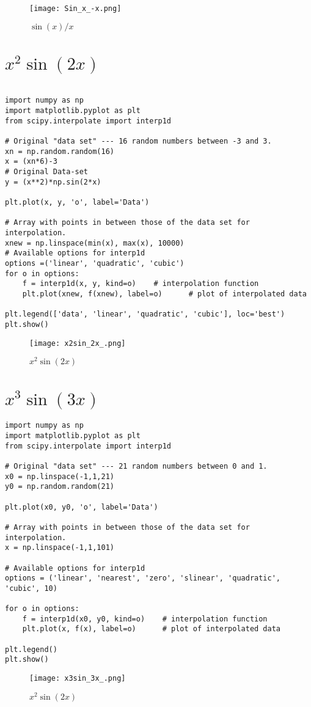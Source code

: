 \documentclass[a4 paper]{article}
\numberwithin{equation}{section}
\newcommand{\0}{\mathbf{0}}
\begin{document}
\begin{figure}[!ht]
  \centering
      \texttt{[image: Sin\_x\_-x.png]}
  \caption{$\sin(x)/x$}
\end{figure}

\vspace{0.5cm}

\section{$x^{2}\sin(2x)$}

\begin{verbatim}

import numpy as np
import matplotlib.pyplot as plt
from scipy.interpolate import interp1d

# Original "data set" --- 16 random numbers between -3 and 3.
xn = np.random.random(16)
x = (xn*6)-3
# Original Data-set
y = (x**2)*np.sin(2*x)

plt.plot(x, y, 'o', label='Data')

# Array with points in between those of the data set for interpolation.
xnew = np.linspace(min(x), max(x), 10000)
# Available options for interp1d
options =('linear', 'quadratic', 'cubic')
for o in options:
    f = interp1d(x, y, kind=o)    # interpolation function
    plt.plot(xnew, f(xnew), label=o)      # plot of interpolated data
    
plt.legend(['data', 'linear', 'quadratic', 'cubic'], loc='best')
plt.show()
\end{verbatim}

\newpage
\begin{figure}[!ht]
  \centering
      \texttt{[image: x2sin\_2x\_.png]}
  \caption{$x^{2}\sin(2x)$}
\end{figure}

\vspace{0.5cm}

\section{$x^{3}\sin(3x)$}

\begin{verbatim}
import numpy as np
import matplotlib.pyplot as plt
from scipy.interpolate import interp1d

# Original "data set" --- 21 random numbers between 0 and 1.
x0 = np.linspace(-1,1,21)
y0 = np.random.random(21)

plt.plot(x0, y0, 'o', label='Data')

# Array with points in between those of the data set for interpolation.
x = np.linspace(-1,1,101)

# Available options for interp1d
options = ('linear', 'nearest', 'zero', 'slinear', 'quadratic', 'cubic', 10)

for o in options:
    f = interp1d(x0, y0, kind=o)    # interpolation function
    plt.plot(x, f(x), label=o)      # plot of interpolated data

plt.legend()
plt.show()
\end{verbatim}


\begin{figure}[!ht]
  \centering
      \texttt{[image: x3sin\_3x\_.png]}
  \caption{$x^{2}\sin(2x)$}
\end{figure}

\vspace{0.5cm}
\end{document}

